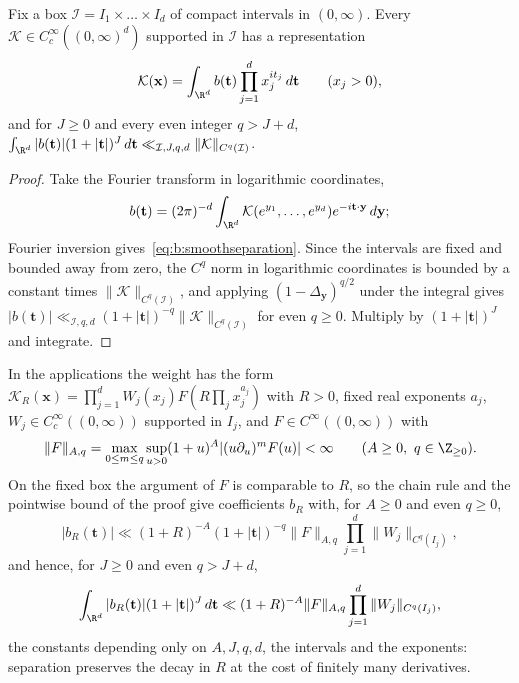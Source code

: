\begin{lemma}\label{lem:b:smooth}
Fix a box $\mathcal I=I_1\times\dots\times I_d$ of compact intervals in $(0,\infty)$. Every $\mathcal K\in C_c^\infty((0,\infty)^d)$ supported in $\mathcal I$ has a representation
\begin{equation}\label{eq:b:smoothseparation}
  \mathcal K(\mathbf x)=\int_{\R^d}b(\mathbf t)\prod_{j=1}^dx_j^{it_j}\dd\mathbf t\qquad(x_j>0),
\end{equation}
and for $J\ge0$ and every even integer $q>J+d$, $\int_{\R^d}|b(\mathbf t)|(1+|\mathbf t|)^J\dd\mathbf t\ll_{\mathcal I,J,q,d}\|\mathcal K\|_{C^q(\mathcal I)}$.
\end{lemma}

\begin{proof}
Take the Fourier transform in logarithmic coordinates,
\[
  b(\mathbf t)=(2\pi)^{-d}\int_{\R^d}\mathcal K(e^{y_1},\dots,e^{y_d})e^{-i\mathbf t\cdot\mathbf y}\dd\mathbf y;
\]
Fourier inversion gives~\eqref{eq:b:smoothseparation}. Since the intervals are fixed and bounded away from zero, the $C^q$ norm in logarithmic coordinates is bounded by a constant times $\|\mathcal K\|_{C^q(\mathcal I)}$, and applying $(1-\Delta_{\mathbf y})^{q/2}$ under the integral gives $|b(\mathbf t)|\ll_{\mathcal I,q,d}(1+|\mathbf t|)^{-q}\|\mathcal K\|_{C^q(\mathcal I)}$ for even $q\ge0$. Multiply by $(1+|\mathbf t|)^J$ and integrate.
\end{proof}

In the applications the weight has the form $\mathcal K_R(\mathbf x)=\prod_{j=1}^dW_j(x_j)F(R\prod_jx_j^{a_j})$ with $R>0$, fixed real exponents $a_j$, $W_j\in C_c^\infty((0,\infty))$ supported in $I_j$, and $F\in C^\infty((0,\infty))$ with
\[
  \|F\|_{A,q}=\max_{0\le m\le q}\sup_{u>0}(1+u)^A|(u\partial_u)^mF(u)|<\infty\qquad(A\ge0,\ q\in\Z_{\ge0}).
\]
On the fixed box the argument of $F$ is comparable to $R$, so the chain rule and the pointwise bound of the proof give coefficients $b_R$ with, for $A\ge0$ and even $q\ge0$,
\begin{equation}\label{eq:b:smoothpointwise}
  |b_R(\mathbf t)|\ll(1+R)^{-A}(1+|\mathbf t|)^{-q}\|F\|_{A,q}\prod_{j=1}^d\|W_j\|_{C^q(I_j)},
\end{equation}
and hence, for $J\ge0$ and even $q>J+d$,
\begin{equation}\label{eq:b:smoothweightbound}
  \int_{\R^d}|b_R(\mathbf t)|(1+|\mathbf t|)^J\dd\mathbf t\ll(1+R)^{-A}\|F\|_{A,q}\prod_{j=1}^d\|W_j\|_{C^q(I_j)},
\end{equation}
the constants depending only on $A,J,q,d$, the intervals and the exponents: separation preserves the decay in $R$ at the cost of finitely many derivatives.

